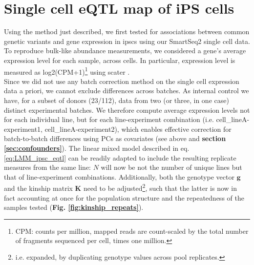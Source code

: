 
\section{Single cell eQTL map of iPS cells}
\label{sec:sc_ipsc_eqtl}

Using the method just described, we first tested for associations between common genetic variants and gene expression in \glspl{ipsc} using our SmartSeq2 single cell data.\\

To reproduce bulk-like abundance measurements, we considered a gene's average expression level for each sample, across cells.
In particular, expression level is measured as log2(CPM+1)\footnote{CPM: counts per million, mapped reads are count-scaled by the total number of fragments sequenced per cell, times one million.} using scater \cite{mccarthy2017scater}.
\\

Since we did not use any batch correction method on the single cell expression data a priori, we cannot exclude differences across batches.
As internal control we have, for a subset of donors (23/112), data from two (or three, in one case) distinct experimental batches.
We therefore compute average expression levels not for each individual line, but for each line-experiment combination (i.e. cell\_lineA-experiment1, cell\_lineA-experiment2), which enables effective correction for batch-to-batch differences using PCs as covariates (see above and \textbf{section
\ref{sec:confounders}}).
The linear mixed model described in eq. \eqref{eq:LMM_ipsc_eqtl} can be readily adapted to include the resulting replicate measures from the same line: $N$ will now be not the number of unique lines but that of line-experiment combinations.
Additionally, both the genotype vector $\mathbf{g}$ and the kinship matrix $\mathbf{K}$ need to be adjusted\footnote{i.e. expanded, by duplicating genotype values across pool replicates.}, such that the latter is now in fact accounting at once for the population structure and the repeatedness of the samples tested (\textbf{Fig. \ref{fig:kinship_repeats}}). \\

